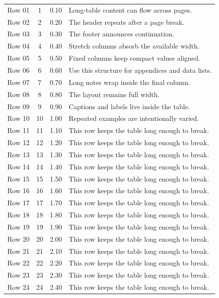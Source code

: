 \begin{tabularx}{\textwidth}{| l | c | r | L |}
	Row 01 & 1 & 0.10 & Long-table content can flow across pages. \\
	Row 02 & 2 & 0.20 & The header repeats after a page break. \\
	Row 03 & 3 & 0.30 & The footer announces continuation. \\
	Row 04 & 4 & 0.40 & Stretch columns absorb the available width. \\
	Row 05 & 5 & 0.50 & Fixed columns keep compact values aligned. \\
	Row 06 & 6 & 0.60 & Use this structure for appendices and data lists. \\
	Row 07 & 7 & 0.70 & Long notes wrap inside the final column. \\
	Row 08 & 8 & 0.80 & The layout remains full width. \\
	Row 09 & 9 & 0.90 & Captions and labels live inside the table. \\
	Row 10 & 10 & 1.00 & Repeated examples are intentionally varied. \\
	Row 11 & 11 & 1.10 & This row keeps the table long enough to break. \\
	Row 12 & 12 & 1.20 & This row keeps the table long enough to break. \\
	Row 13 & 13 & 1.30 & This row keeps the table long enough to break. \\
	Row 14 & 14 & 1.40 & This row keeps the table long enough to break. \\
	Row 15 & 15 & 1.50 & This row keeps the table long enough to break. \\
	Row 16 & 16 & 1.60 & This row keeps the table long enough to break. \\
	Row 17 & 17 & 1.70 & This row keeps the table long enough to break. \\
	Row 18 & 18 & 1.80 & This row keeps the table long enough to break. \\
	Row 19 & 19 & 1.90 & This row keeps the table long enough to break. \\
	Row 20 & 20 & 2.00 & This row keeps the table long enough to break. \\
	Row 21 & 21 & 2.10 & This row keeps the table long enough to break. \\
	Row 22 & 22 & 2.20 & This row keeps the table long enough to break. \\
	Row 23 & 23 & 2.30 & This row keeps the table long enough to break. \\
	Row 24 & 24 & 2.40 & This row keeps the table long enough to break. \\

\end{tabularx}
